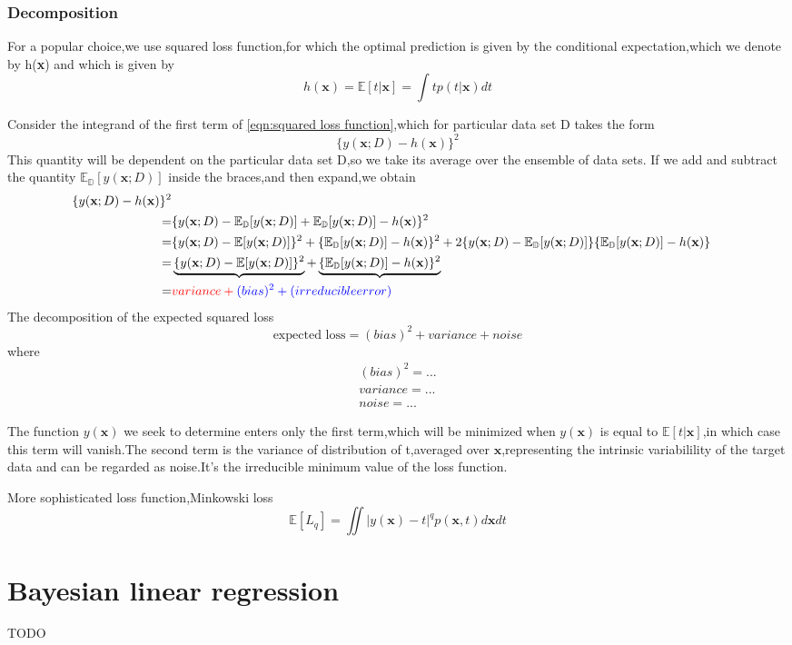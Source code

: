 \subsubsection{Decomposition}
For a popular choice,we use squared loss function,for which the optimal prediction is given by the conditional
expectation,which we denote by h(\textbf{x}) and which is given by 
\begin{equation}
h(\textbf{x}) = \mathbb{E}[t|\textbf{x}] = \int tp(t|\textbf{x})dt
\end{equation}

Consider the integrand of the first term of \ref{eqn:squared loss function},which for particular data set D takes the form
\begin{equation}
\{ y(\textbf{x};D) - h(\textbf{x}) \} ^2
\end{equation}
This quantity will be dependent on the particular data set D,so we take its average over the ensemble of data sets.
If we add and subtract the quantity $ \mathbb{E_D}[y(\textbf{x};D)] $ inside the braces,and then expand,we obtain
\begin{align}
\{ y(\textbf{x};D) - h(\textbf{x}) \} ^2 \\
=&\{y(\textbf{x};D) - \mathbb{E_D}[y(\textbf{x};D)] + \mathbb{E_D}[y(\textbf{x};D)] -h(\textbf{x})  \}^2         \\
=& \{ y(\textbf{x};D) -\mathbb{E}[y(\textbf{x};D)]    \}^2 + \{ \mathbb{E_D}[y(\textbf{x};D)] - h(\textbf{x})\}^2 +
2\{ y(\textbf{x};D) - \mathbb{E_D}[y(\textbf{x};D)]\}\{ \mathbb{E_D}[y(\textbf{x};D)] -h(\textbf{x})\} \\
=& \underbrace{\{ y(\textbf{x};D) -\mathbb{E}[y(\textbf{x};D)]    \}^2} + \underbrace{\{ \mathbb{E_D}[y(\textbf{x};D)] - h(\textbf{x})\}^2}   \\
=&                    \color{red}{variance}                 +   \color{blue}{(bias)^2}  + (irreducible error)
\end{align}
The decomposition of the expected squared loss
\begin{equation}
\text{expected loss} = (bias)^2 + variance + noise
\end{equation}
where
\begin{eqnarray}
(bias)^2 = ... \\
variance = ... \\
noise = ...
\end{eqnarray}

The function $ y(\textbf{x}) $ we seek to determine enters only the first term,which will be minimized when $ y(\textbf{x}) $ is equal to $ \mathbb{E}[t|\textbf{x}] $,in which case this term will vanish.The second term is the variance of distribution of t,averaged over $ \textbf{x} $,representing the intrinsic variabilility of the target data and can be regarded as noise.It's the irreducible minimum value of the loss function.

More sophisticated loss function,Minkowski loss
\begin{equation}
\mathbb{E}[\mathit{L_q}] = \iint| y(\textbf{x}) - t |^q p(\textbf{x},t)d\textbf{x}dt
\end{equation}


\section{Bayesian linear regression}
TODO

